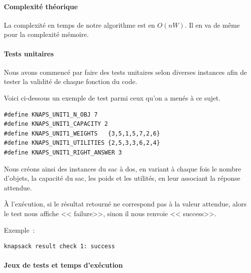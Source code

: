 \documentclass[a4paper, 12pt]{article}
\begin{document}
\paragraph{Complexité théorique}

La complexité en temps de notre algorithme est en $O(nW)$. Il en va de
même pour la complexité mémoire.

\paragraph{Tests unitaires}

Nous avons commencé par faire des tests unitaires selon diverses
instances afin de tester la validité de chaque fonction du code.

Voici ci-dessous un exemple de test parmi ceux qu'on a menés à ce sujet.

\begin{lstlisting}
#define KNAPS_UNIT1_N_OBJ 7
#define KNAPS_UNIT1_CAPACITY 2
#define KNAPS_UNIT1_WEIGHTS   {3,5,1,5,7,2,6}
#define KNAPS_UNIT1_UTILITIES {2,5,3,3,6,2,4}
#define KNAPS_UNIT1_RIGHT_ANSWER 3
\end{lstlisting}

Nous créons ainsi des instances du sac à dos, en variant à chaque fois le nombre d'objets, la capacité du sac, les poids et les utilités, en leur associant la réponse attendue.

À l'exécution, si le résultat retourné ne correspond pas à la valeur attendue, alors le test nous affiche << failure>>, sinon il nous renvoie << success>>.

Exemple~:
\begin{lstlisting}
knapsack result check 1: success
\end{lstlisting}

\paragraph{Jeux de tests et temps d'exécution}
\end{document}
